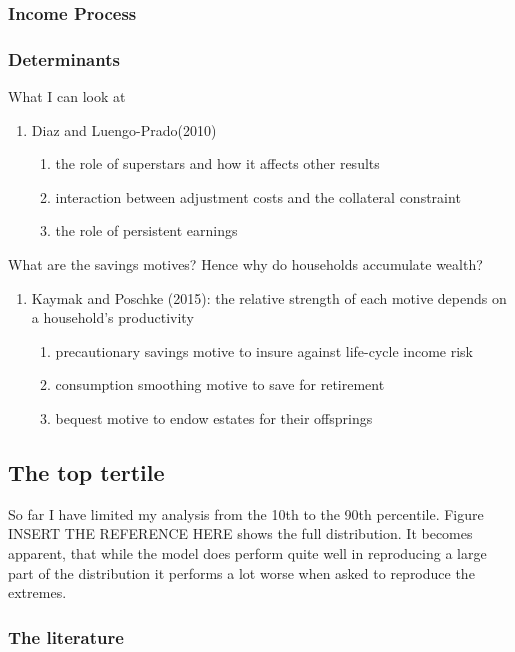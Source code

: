 \documentclass[a4paper,12pt]{article}
\begin{document}
\subsubsection{Income Process}

\subsubsection{Determinants}
What I can look at
\begin{enumerate}
\item Diaz and Luengo-Prado(2010)
\begin{enumerate}
\item the role of superstars and how it affects other results
\item interaction between adjustment costs and the collateral constraint
\item the role of persistent earnings
\end{enumerate}

\end{enumerate}
What are the savings motives? Hence why do households accumulate wealth?
\begin{enumerate}
\item Kaymak and Poschke (2015): the relative strength of each motive depends on a household's productivity
\begin{enumerate}
\item precautionary savings motive to insure against life-cycle income risk
\item consumption smoothing motive to save for retirement
\item bequest motive to endow estates for their offsprings
\end{enumerate}
\end{enumerate}


\subsection{The top tertile}
So far I have limited my analysis from the 10th to the 90th percentile. Figure INSERT THE REFERENCE HERE shows the full distribution. It becomes apparent, that while the model does perform quite well in reproducing a large part of the distribution it performs a lot worse when asked to reproduce the extremes. 

\subsubsection{The literature}
\end{document}
